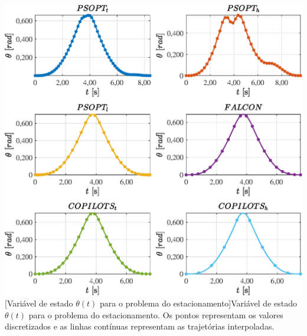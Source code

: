 \noindent
\begin{minipage}{\textwidth}
	\vspace{\onelineskip}
	\centering
	\includegraphics[scale=0.7]{fig/resultados/estacionamento/traj/x/theta}
	[Variável de estado $\theta(t)$ para o problema do estacionamento]{Variável de estado $\theta(t)$ para o problema do estacionamento. Os pontos representam os valores discretizados e as linhas contínuas representam as trajetórias interpoladas.}
	\label{fig:estacionamento:x:theta}
	\vspace{\onelineskip}
\end{minipage}

